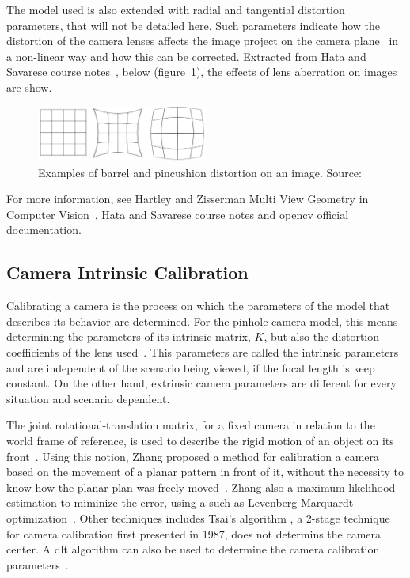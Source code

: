 The model used is also extended with radial and tangential distortion parameters, that will not be detailed here. Such parameters indicate how the distortion of the camera lenses affects the image project on the camera plane~\cite{camera_models, Sturm2010} in a non-linear way and how this can be corrected. Extracted from Hata and Savarese course notes~\cite{camera_models}, below (figure~\ref{fig:lense_distortion_types}), the effects of lens aberration on images are show.

\begin{figure}[h]
	\centering
	\includegraphics[width=0.5\textwidth]{img/camera/distortion.png}
	\caption{Examples of barrel and pincushion distortion on an image. Source: \cite{camera_models}}
	\label{fig:lense_distortion_types}
\end{figure}

For more information, see Hartley and Zisserman Multi View Geometry in Computer Vision~\cite{mvg_book}, Hata and Savarese course notes\cite{camera_models} and \acf{opencv} official documentation\cite{opencv_doc}. 

\subsection{Camera Intrinsic Calibration}
Calibrating a camera is the process on which the parameters of the model that describes its behavior are determined. For the pinhole camera model, this means determining the parameters of its intrinsic matrix, $K$, but also the distortion coefficients of the lens used~\cite{mvg_book, camera_models}. This parameters are called the intrinsic parameters and are independent of the scenario being viewed, if the focal length is keep constant. On the other hand, extrinsic camera parameters are different for every situation and scenario dependent.

The joint rotational-translation matrix, for a fixed camera in relation to the world frame of reference, is used to describe the rigid motion of an object on its front~\cite{opencv_doc}. Using this notion, Zhang proposed a method for calibration a camera based on the movement of a planar pattern in front of it, without the necessity to know how the planar plan was freely moved~\cite{Zhengyou2000, mvg_book}. Zhang also a maximum-likelihood estimation to miminize the error, using a such as Levenberg-Marquardt optimization~\cite{Levenberg1943}. Other techniques includes Tsai's algorithm \cite{Roger1987, mvg_book}, a 2-stage technique for camera calibration first presented in 1987, does not determins the camera center. A \ac{dlt} algorithm can also be used to determine the camera calibration parameters~\cite{mvg_book}.


